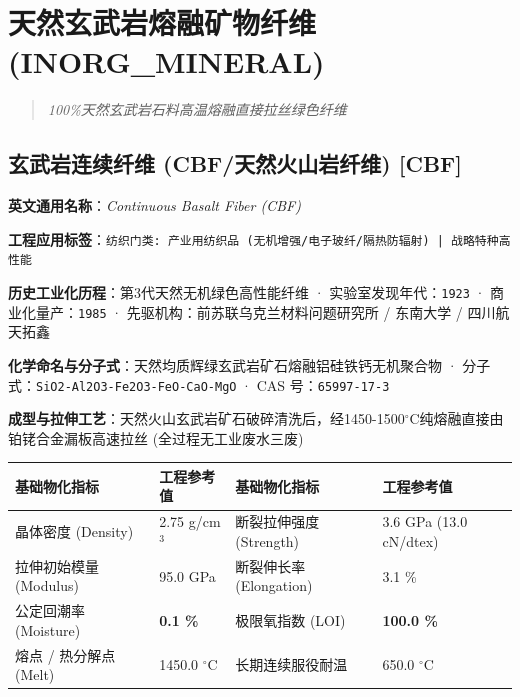 \documentclass[11pt,openright,twoside,UTF8]{ctexbook}
\begin{document}
\chapter{天然玄武岩熔融矿物纤维 (INORG\_MINERAL)}
\begin{quote}
\small\itshape
100\%天然玄武岩石料高温熔融直接拉丝绿色纤维
\end{quote}

\section{玄武岩连续纤维 (CBF/天然火山岩纤维) [CBF]}
\label{sec:cbf}

\noindent\textbf{英文通用名称}：\textit{Continuous Basalt Fiber (CBF)}\par
\noindent\textbf{工程应用标签}：\texttt{纺织门类: 产业用纺织品 (无机增强/电子玻纤/隔热防辐射) | 战略特种高性能}\par
\noindent\textbf{历史工业化历程}：第3代天然无机绿色高性能纤维 · 实验室发现年代：\texttt{1923} · 商业化量产：\texttt{1985} · 先驱机构：前苏联乌克兰材料问题研究所 / 东南大学 / 四川航天拓鑫\par
\noindent\textbf{化学命名与分子式}：天然均质辉绿玄武岩矿石熔融铝硅铁钙无机聚合物 · 分子式：\texttt{SiO2-Al2O3-Fe2O3-FeO-CaO-MgO} · CAS 号：\texttt{65997-17-3}\par
\noindent\textbf{成型与拉伸工艺}：天然火山玄武岩矿石破碎清洗后，经1450-1500$^\circ\mathrm{C}$纯熔融直接由铂铑合金漏板高速拉丝 (全过程无工业废水三废)\par

\vspace{0.15cm}
\begin{center}
\small
\begin{tabularx}{\textwidth}{p{3.8cm}Xp{3.8cm}X}
\toprule
\textbf{基础物化指标} & \textbf{工程参考值} & \textbf{基础物化指标} & \textbf{工程参考值} \\
\midrule
晶体密度 (Density) & 2.75 g/cm$^3$ & 断裂拉伸强度 (Strength) & 3.6 GPa (13.0 cN/dtex) \\
拉伸初始模量 (Modulus) & 95.0 GPa & 断裂伸长率 (Elongation) & 3.1 \% \\
公定回潮率 (Moisture) & \textbf{0.1 \%} & 极限氧指数 (LOI) & \textbf{100.0 \%} \\
熔点 / 热分解点 (Melt) & 1450.0 $^\circ\mathrm{C}$ & 长期连续服役耐温 & 650.0 $^\circ\mathrm{C}$ \\
\bottomrule
\end{tabularx}
\end{center}
\vspace{0.15cm}
\end{document}
